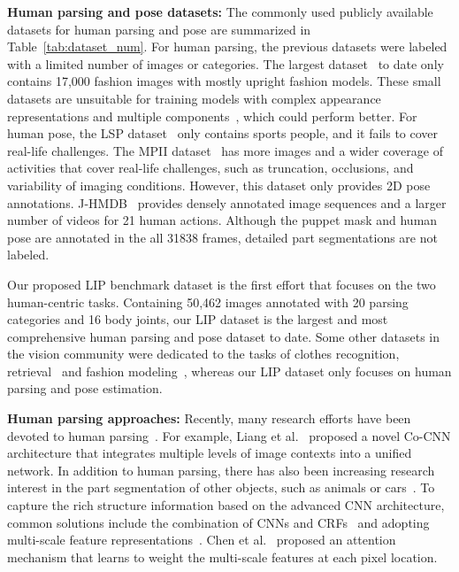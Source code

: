 \documentclass[10pt,journal,compsoc]{IEEEtran}
\begin{document}
\textbf{Human parsing and pose datasets:}
The commonly used publicly available datasets for human parsing and pose are summarized in Table~\ref{tab:dataset_num}. For human parsing, the previous datasets were labeled with a limited number of images or categories. The largest dataset~\cite{Co-CNN} to date only contains 17,000 fashion images with mostly upright fashion models. These small datasets are unsuitable for training models with complex appearance representations and multiple components~\cite{johnson2011learning,taskar2013modec,dantone2013human}, which could perform better. For human pose, the LSP dataset~\cite{Johnson10} only contains sports people, and it fails to cover real-life challenges. The MPII dataset~\cite{andriluka14cvpr} has more images and a wider coverage of activities that cover real-life challenges, such as truncation, occlusions, and variability of imaging conditions. However, this dataset only provides 2D pose annotations. {J-HMDB~\cite{Jhuang:ICCV:2013} provides densely annotated image sequences and a larger number of videos for 21 human actions. Although the puppet mask and human pose are annotated in the all 31838 frames, detailed part segmentations are not labeled. }

Our proposed LIP benchmark dataset is the first effort that focuses on the two human-centric tasks. Containing 50,462 images annotated with 20 parsing categories and 16 body joints, our LIP dataset is the largest and most comprehensive human parsing and pose dataset to date. Some other datasets in the vision community were dedicated to the tasks of clothes recognition, retrieval~\cite{liuLQWTcvpr16DeepFashion} and fashion modeling~\cite{simo2015neuroaesthetics}, whereas our LIP dataset only focuses on human parsing and pose estimation.

\textbf{Human parsing approaches:}  
Recently, many research efforts have been devoted to human parsing~\cite{Co-CNN,yamaguchi2012parsing,Yamaguchiparsing13,SimoSerraACCV2014,M-CNN,xia2015zoom,chen2015attention}. For example, Liang et al.~\cite{Co-CNN} proposed a novel Co-CNN architecture that integrates multiple levels of image contexts into a unified network. In addition to human parsing, there has also been increasing research interest in the part segmentation of other objects, such as animals or cars~\cite{wang2014semantic,wang2015joint,lu2014parsing}. To capture the rich structure information based on the advanced CNN architecture, common solutions include the combination of CNNs and CRFs~\cite{chen2016deeplab,crfasrnn} and adopting multi-scale feature representations~\cite{chen2016deeplab,chen2015attention,xia2015zoom}. Chen et al.~\cite{chen2015attention} proposed an attention mechanism that learns to weight the multi-scale features at each pixel location. 
\end{document}
